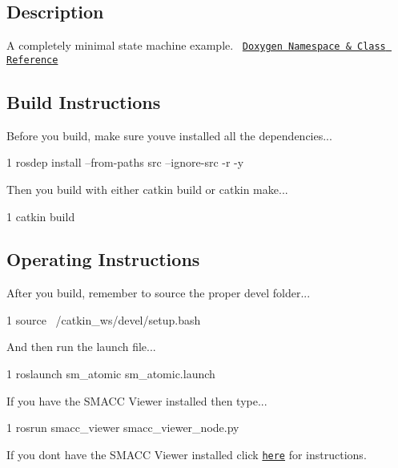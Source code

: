 

\subsection*{Description}

A completely minimal state machine example.~\newline
 \href{https://reelrbtx.github.io/SMACC_Documentation/master/html/namespacesm__atomic.html}{\tt Doxygen Namespace \& Class Reference}

\subsection*{Build Instructions}

Before you build, make sure you\textquotesingle{}ve installed all the dependencies...


\begin{DoxyCode}
1 rosdep install --from-paths src --ignore-src -r -y 
\end{DoxyCode}


Then you build with either catkin build or catkin make...


\begin{DoxyCode}
1 catkin build
\end{DoxyCode}
 \subsection*{Operating Instructions}

After you build, remember to source the proper devel folder...


\begin{DoxyCode}
1 source ~/catkin\_ws/devel/setup.bash
\end{DoxyCode}


And then run the launch file...


\begin{DoxyCode}
1 roslaunch sm\_atomic sm\_atomic.launch
\end{DoxyCode}


If you have the S\+M\+A\+CC Viewer installed then type...


\begin{DoxyCode}
1 rosrun smacc\_viewer smacc\_viewer\_node.py
\end{DoxyCode}


If you don\textquotesingle{}t have the S\+M\+A\+CC Viewer installed click \href{smacc.ninja/smacc-viewer/}{\tt here} for instructions. 